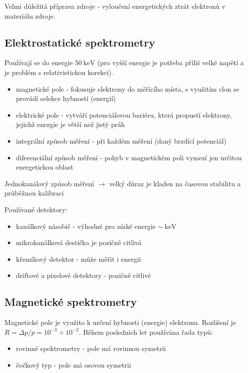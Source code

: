 \documentclass[../../main.tex]{subfiles}
\begin{document}
Velmi důležitá příprava zdroje - vyloučení energetických ztrát elektronů v materiálu zdroje.

\subsection{Elektrostatické spektrometry}

Používají se do energie $50 ~\mathrm{keV}$ (pro vyšší energie je potřeba příliš velké napětí a je problém s relativistickou korekcí). 
\begin{itemize}
	\item magnetické pole - fokusuje elektrony do měřícího místa, s využitím clon se provádí selekce hybností (energií)
	\item elektrické pole - vytváří potenciálovou bariéru, která propustí elektrony, jejichž energie je větší než jistý práh
	\item integrální způsob měření - při každém měření  (daný brzdící potenciál)
	\item diferenciální způsob měření - pohyb v magnetickém poli vymezí jen určitou energetickou oblast
\end{itemize}

Jednokanálový způsob měření $\rightarrow$ velký důraz je kladen na časovou stabilitu a průběžnou kalibraci

Používané detektory:
\begin{itemize}
	\item kanálkový násobič - výhodné pro nízké energie $\sim ~\mathrm{keV}$
	\item mikrokanálková destička je pozičně citlivá
	\item křemíkový detektor - může měřit i energii
	\item driftové a pixelové detektory - pozičně citlivé
\end{itemize}

\subsection{Magnetické spektrometry}

Magnetické pole je využito k určení hybnosti (energie) elektronu. Rozlišení je $R = \Delta p/p = 10^{-3} \div 10^{-2}$. Během posledních let používána řada typů:
\begin{itemize}
	\item rovinné spektrometry - pole má rovinnou symetrii
	\item čočkový typ - pole má osovou symetrii
\end{itemize}
\end{document}
